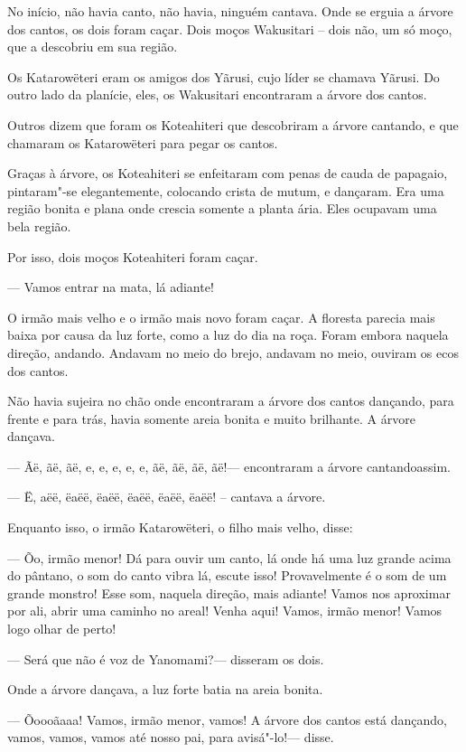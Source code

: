  

 No início, não havia canto, não havia, ninguém
cantava. Onde se erguia a árvore dos cantos, os dois foram caçar. Dois
moços Wakusitari -- dois não, um só moço, que a descobriu em sua região.

Os Katarowëteri eram os amigos dos Yãrusi, cujo líder se chamava Yãrusi.
Do outro lado da planície, eles, os Wakusitari encontraram a árvore dos
cantos. 

Outros dizem que foram os Koteahiteri que descobriram a árvore cantando,
e que chamaram os Katarowëteri para pegar os cantos. 

Graças à árvore, os Koteahiteri se enfeitaram com penas de cauda de
papagaio, pintaram"-se elegantemente, colocando crista de mutum, e
dançaram. Era uma região bonita e plana onde crescia somente a planta
ária. Eles ocupavam uma bela região. 

Por isso, dois moços Koteahiteri foram caçar. 

--- Vamos entrar na mata, lá adiante! 

O irmão mais velho e o irmão mais novo foram caçar. A floresta parecia
mais baixa por causa da luz forte, como a luz do dia na roça. Foram
embora naquela direção, andando. Andavam no meio do brejo, andavam no
meio, ouviram os ecos dos cantos. 

Não havia sujeira no chão onde encontraram a árvore dos cantos dançando,
para frente e para trás, havia somente areia bonita e muito brilhante. A
árvore dançava. 

--- Ãë, ãë, ãë, e, e, e, e, e, ãë, ãë, ãë, ãë!--- encontraram a árvore
cantandoassim. 

--- Ë, aëë, ëaëë, ëaëë, ëaëë, ëaëë, ëaëë! -- cantava a árvore. 

Enquanto isso, o irmão Katarowëteri, o filho mais velho, disse: 

--- Õo, irmão menor! Dá para ouvir um canto, lá onde há uma luz grande
acima do pântano, o som do canto vibra lá, escute isso! Provavelmente é
o som de um grande monstro! Esse som, naquela direção, mais adiante!
Vamos nos aproximar por ali, abrir uma caminho no areal! Venha aqui!
Vamos, irmão menor! Vamos logo olhar de perto! 

--- Será que não é voz de Yanomami?--- disseram os dois. 

Onde a árvore dançava, a luz forte batia na areia bonita. 

--- Õoooãaaa! Vamos, irmão menor, vamos! A árvore dos cantos está
dançando, vamos, vamos, vamos até nosso pai, para avisá"-lo!--- disse. 

